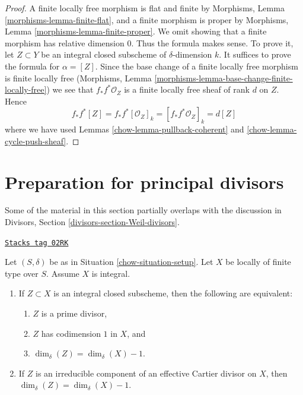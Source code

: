 \begin{proof}

A finite locally free morphism is flat and finite by
Morphisms, Lemma \ref{morphisms-lemma-finite-flat},
and a finite morphism is proper
by Morphisms, Lemma \ref{morphisms-lemma-finite-proper}.
We omit showing that a finite
morphism has relative dimension $0$. Thus the formula makes sense.
To prove it, let $Z \subset Y$ be an integral closed subscheme
of $\delta$-dimension $k$. It suffices to prove the formula
for $\alpha = [Z]$. Since the base change of a finite locally free
morphism is finite locally free
(Morphisms, Lemma \ref{morphisms-lemma-base-change-finite-locally-free})
we see that $f_*f^*\mathcal{O}_Z$ is a finite locally free sheaf of
rank $d$ on $Z$. Hence
$$
f_*f^*[Z] = f_*f^*[\mathcal{O}_Z]_k =
[f_*f^*\mathcal{O}_Z]_k = d[Z]
$$
where we have used Lemmas \ref{chow-lemma-pullback-coherent} and
\ref{chow-lemma-cycle-push-sheaf}.
\end{proof}

\section{Preparation for principal divisors}
\label{chow-section-preparation-principal-divisors}
Some of the material in this section partially overlaps with the
discussion in Divisors, Section \ref{divisors-section-Weil-divisors}.

\begin{lemma}
\label{chow-lemma-divisor-delta-dimension}
\href{https://stacks.math.columbia.edu/tag/02RK}{\texttt{Stacks tag 02RK}}

Let $(S, \delta)$ be as in Situation \ref{chow-situation-setup}.
Let $X$ be locally of finite type over $S$. Assume $X$ is
integral.
\begin{enumerate}
\item If $Z \subset X$ is an integral closed subscheme, then
the following are equivalent:
\begin{enumerate}
\item $Z$ is a prime divisor,
\item $Z$ has codimension $1$ in $X$, and
\item $\dim_\delta(Z) = \dim_\delta(X) - 1$.
\end{enumerate}
\item If $Z$ is an irreducible component of an effective Cartier
divisor on $X$, then $\dim_\delta(Z) = \dim_\delta(X) - 1$.
\end{enumerate}
\end{lemma}

